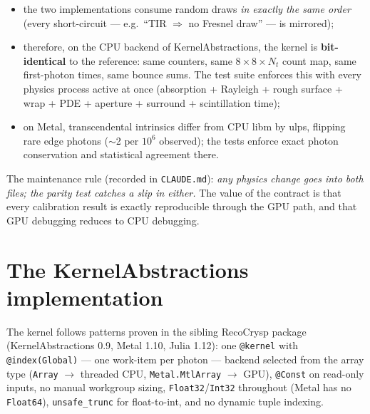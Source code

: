 \documentclass[11pt,a4paper]{article}
\newcommand{\code}[1]{\texttt{#1}}
\begin{document}
\begin{itemize}
  \item the two implementations consume random draws \emph{in exactly the same order}
    (every short-circuit --- e.g.\ ``TIR $\Rightarrow$ no Fresnel draw'' --- is
    mirrored);
  \item therefore, on the CPU backend of KernelAbstractions, the kernel is
    \textbf{bit-identical} to the reference: same counters, same $8\times8\times N_t$
    count map, same first-photon times, same bounce sums. The test suite enforces this
    with every physics process active at once (absorption + Rayleigh + rough surface +
    wrap + PDE + aperture + surround + scintillation time);
  \item on Metal, transcendental intrinsics differ from CPU libm by ulps, flipping
    rare edge photons ($\sim$2 per $10^6$ observed); the tests enforce exact photon
    conservation and statistical agreement there.
\end{itemize}

The maintenance rule (recorded in \code{CLAUDE.md}): \emph{any physics change goes
into both files; the parity test catches a slip in either.} The value of the contract
is that every calibration result is exactly reproducible through the GPU path, and
that GPU debugging reduces to CPU debugging.

\section{The KernelAbstractions implementation}
\label{sec:ka}

The kernel follows patterns proven in the sibling RecoCrysp package (KernelAbstractions
0.9, Metal 1.10, Julia 1.12): one \code{@kernel} with \code{@index(Global)} --- one
work-item per photon --- backend selected from the array type
(\code{Array} $\to$ threaded CPU, \code{Metal.MtlArray} $\to$ GPU), \code{@Const} on
read-only inputs, no manual workgroup sizing, \code{Float32}/\code{Int32} throughout
(Metal has no \code{Float64}), \code{unsafe\_trunc} for float-to-int, and no dynamic
tuple indexing.
\end{document}
